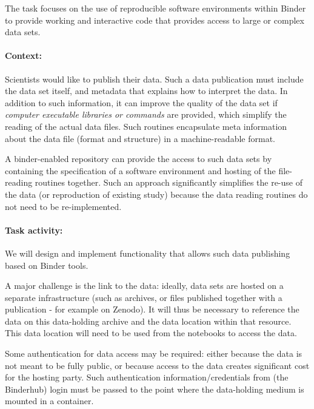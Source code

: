 \begin{task}[
  title=Data publishing,
  id=data-publishing,
  lead=MP,
  PM=8,
  wphases={0-36},
  partners={IFR,UIO}
  ]
  The task focuses on the use of reproducible software environments within
  Binder to provide working and interactive code that provides access to large
  or complex data sets.

  \paragraph*{Context:} Scientists would like to publish their data. Such a data
  publication must include the data set itself, and metadata that explains how to
  interpret the data. In addition to such information, it can improve the
  quality of the data set if \emph{computer executable libraries or commands}
  are provided, which simplify the reading of the actual data files. Such
  routines encapsulate meta information about the data file (format and
  structure) in a machine-readable format.

  A binder-enabled repository can provide the access to such data sets by
  containing the specification of a software environment and hosting of the
  file-reading routines together. Such an approach significantly simplifies the
  re-use of the data (or reproduction of existing study) because the data
  reading routines do not need to be re-implemented.

  \paragraph*{Task activity:}
  We will design and implement functionality that allows such data publishing
  based on Binder tools.

  A major challenge is the link to the data: ideally, data sets are hosted on a
  separate infrastructure (such as archives, or files published together with a
  publication - for example on Zenodo). It will thus be necessary to reference
  the data on this data-holding archive and the data location within that resource.
  This data location will need to be used from the notebooks to access
  the data. %

  Some authentication for data access may be required: either because the data
  is not meant to be fully public, or because access to the data creates
  significant cost for the hosting party. Such authentication
  information/credentials from (the Binderhub) login must be passed to the point
  where the data-holding medium is mounted in a container.


\end{task}
